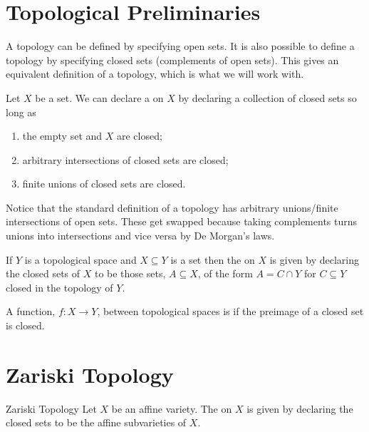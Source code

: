\documentclass[fleqn]{NotesClass}
\begin{document}
    \section{Topological Preliminaries}
    A topology can be defined by specifying open sets.
    It is also possible to define a topology by specifying closed sets (complements of open sets).
    This gives an equivalent definition of a topology, which is what we will work with.
    
    \begin{lma}{}{}
        Let \(X\) be a set.
        We can declare a  on \(X\) by declaring a collection of closed sets so long as
        \begin{enumerate}
            \item the empty set and \(X\) are closed;
            \item arbitrary intersections of closed sets are closed;
            \item finite unions of closed sets are closed.
        \end{enumerate}
    \end{lma}
    
    Notice that the standard definition of a topology has arbitrary unions/finite intersections of open sets.
    These get swapped because taking complements turns unions into intersections and vice versa by De Morgan's laws.
    
    \begin{lma}{}{}
        If \(Y\) is a topological space and \(X \subseteq Y\) is a set then the  on \(X\) is given by declaring the closed sets of \(X\) to be those sets, \(A \subseteq X\), of the form \(A = C \cap Y\) for \(C \subseteq Y\) closed in the topology of \(Y\).
    \end{lma}
    
    \begin{lma}{}{}
        A function, \(f \colon X \to Y\), between topological spaces is  if the preimage of a closed set is closed.
    \end{lma}
    
    \section{Zariski Topology}
    \begin{dfn}{Zariski Topology}{}
        Let \(X\) be an affine variety.
        The  on \(X\) is given by declaring the closed sets to be the affine subvarieties of \(X\).
    \end{dfn}
    
\end{document}
